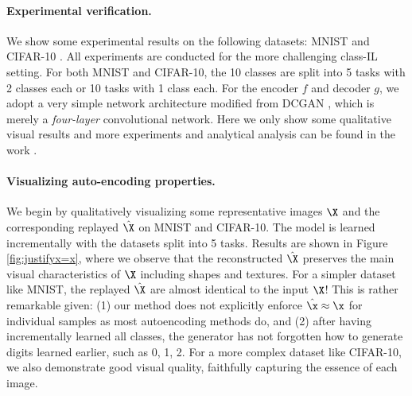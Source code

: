 \documentclass[../../book-main.tex]{subfiles}
\begin{document}
\paragraph{Experimental verification.}
We show some experimental results on the following datasets: MNIST \cite{lecun1998gradient} and CIFAR-10 \cite{krizhevsky2014cifar}. All experiments are conducted for the more challenging class-IL setting. For both MNIST and CIFAR-10, the 10 classes are split into 5 tasks with 2 classes each or 10 tasks with 1 class each. For the encoder $f$ and decoder $g$, we adopt a very simple network architecture modified from DCGAN \cite{radford2016unsupervised}, which is merely a {\em four-layer} convolutional network. Here we only show some qualitative visual results and more experiments and analytical analysis can be found in the work \cite{tong2023incremental}.

\paragraph{Visualizing auto-encoding properties.}
We begin by qualitatively visualizing some representative images $\X$ and the corresponding replayed $\hat{\X}$ on MNIST and CIFAR-10. The model is learned incrementally with the datasets split into 5 tasks. Results are shown in Figure \ref{fig:justifyx=x}, where we observe that the reconstructed $\hat{\X}$ preserves the main visual characteristics of $\X$ including shapes and textures. For a simpler dataset like MNIST, the replayed $\hat{\X}$ are almost identical to the input $\X$! This is rather remarkable given: (1) our method does not explicitly enforce $\hat{\x} \approx \x$ for individual samples as most autoencoding methods do, and (2) after having incrementally learned all classes, the generator has not forgotten how to generate digits learned earlier, such as 0, 1, 2.  For a more complex dataset like CIFAR-10, we also demonstrate good visual quality, faithfully capturing the essence of each image.
\end{document}
